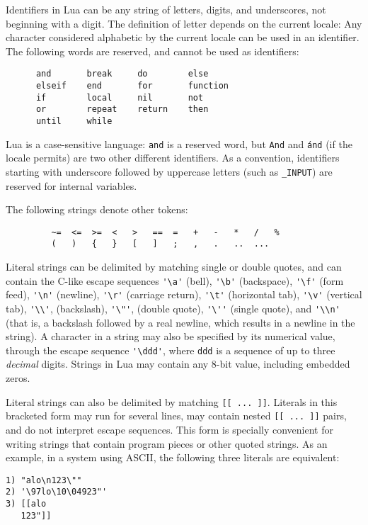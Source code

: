 \documentclass[11pt]{article}
\newcommand{\T}[1]{{\tt #1}}
\newcommand{\Index}[1]{#1\index{#1}}
\begin{document}
\Index{Identifiers} in Lua can be any string of letters,
digits, and underscores,
not beginning with a digit.
The definition of letter depends on the current locale:
Any character considered alphabetic by the current locale
can be used in an identifier.
The following words are reserved, and cannot be used as identifiers:
\begin{verbatim}
      and       break     do        else
      elseif    end       for       function
      if        local     nil       not
      or        repeat    return    then
      until     while
\end{verbatim}
Lua is a case-sensitive language:
\T{and} is a reserved word, but \T{And} and \T{\'and}
(if the locale permits) are two other different identifiers.
As a convention, identifiers starting with underscore followed by
uppercase letters (such as \verb|_INPUT|)
are reserved for internal variables.

The following strings denote other \Index{tokens}:
\begin{verbatim}
         ~=  <=  >=  <   >   ==  =   +   -   *   /   %
         (   )   {   }   [   ]   ;   ,   .   ..  ...
\end{verbatim}

\Index{Literal strings} can be delimited by matching single or double quotes,
and can contain the C-like escape sequences
\verb|'\a'| (bell),
\verb|'\b'| (backspace),
\verb|'\f'| (form feed),
\verb|'\n'| (newline),
\verb|'\r'| (carriage return),
\verb|'\t'| (horizontal tab),
\verb|'\v'| (vertical tab),
\verb|'\\'|, (backslash),
\verb|'\"'|, (double quote),
\verb|'\''| (single quote),
and \verb|'\\n'| (that is, a backslash followed by a real newline,
which  results in a newline in the string).
A character in a string may also be specified by its numerical value,
through the escape sequence \verb|'\ddd'|,
where \verb|ddd| is a sequence of up to three \emph{decimal} digits.
Strings in Lua may contain any 8-bit value, including embedded zeros.

Literal strings can also be delimited by matching \verb|[[ ... ]]|.
Literals in this bracketed form may run for several lines,
may contain nested \verb|[[ ... ]]| pairs,
and do not interpret escape sequences.
This form is specially convenient for
writing strings that contain program pieces or
other quoted strings.
As an example, in a system using ASCII,
the following three literals are equivalent:
\begin{verbatim}
1) "alo\n123\""
2) '\97lo\10\04923"'
3) [[alo
   123"]]
\end{verbatim}
\end{document}

